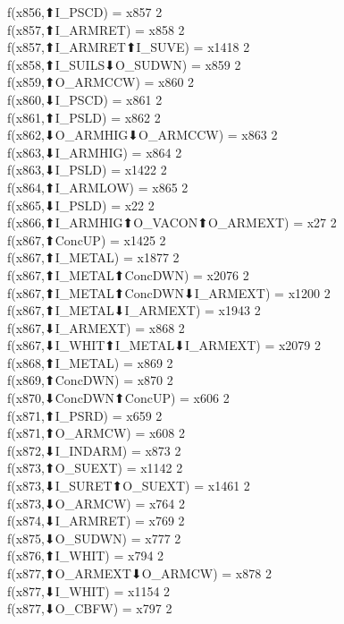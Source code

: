 f(x856,⬆I_PSCD) = x857 {2} \\
f(x857,⬆I_ARMRET) = x858 {2} \\
f(x857,⬆I_ARMRET⬆I_SUVE) = x1418 {2} \\
f(x858,⬆I_SUILS⬇O_SUDWN) = x859 {2} \\
f(x859,⬆O_ARMCCW) = x860 {2} \\
f(x860,⬇I_PSCD) = x861 {2} \\
f(x861,⬆I_PSLD) = x862 {2} \\
f(x862,⬇O_ARMHIG⬇O_ARMCCW) = x863 {2} \\
f(x863,⬇I_ARMHIG) = x864 {2} \\
f(x863,⬇I_PSLD) = x1422 {2} \\
f(x864,⬆I_ARMLOW) = x865 {2} \\
f(x865,⬇I_PSLD) = x22 {2} \\
f(x866,⬆I_ARMHIG⬆O_VACON⬆O_ARMEXT) = x27 {2} \\
f(x867,⬆ConcUP) = x1425 {2} \\
f(x867,⬆I_METAL) = x1877 {2} \\
f(x867,⬆I_METAL⬆ConcDWN) = x2076 {2} \\
f(x867,⬆I_METAL⬆ConcDWN⬇I_ARMEXT) = x1200 {2} \\
f(x867,⬆I_METAL⬇I_ARMEXT) = x1943 {2} \\
f(x867,⬇I_ARMEXT) = x868 {2} \\
f(x867,⬇I_WHIT⬆I_METAL⬇I_ARMEXT) = x2079 {2} \\
f(x868,⬆I_METAL) = x869 {2} \\
f(x869,⬆ConcDWN) = x870 {2} \\
f(x870,⬇ConcDWN⬆ConcUP) = x606 {2} \\
f(x871,⬆I_PSRD) = x659 {2} \\
f(x871,⬆O_ARMCW) = x608 {2} \\
f(x872,⬇I_INDARM) = x873 {2} \\
f(x873,⬆O_SUEXT) = x1142 {2} \\
f(x873,⬇I_SURET⬆O_SUEXT) = x1461 {2} \\
f(x873,⬇O_ARMCW) = x764 {2} \\
f(x874,⬇I_ARMRET) = x769 {2} \\
f(x875,⬇O_SUDWN) = x777 {2} \\
f(x876,⬆I_WHIT) = x794 {2} \\
f(x877,⬆O_ARMEXT⬇O_ARMCW) = x878 {2} \\
f(x877,⬇I_WHIT) = x1154 {2} \\
f(x877,⬇O_CBFW) = x797 {2} \\
